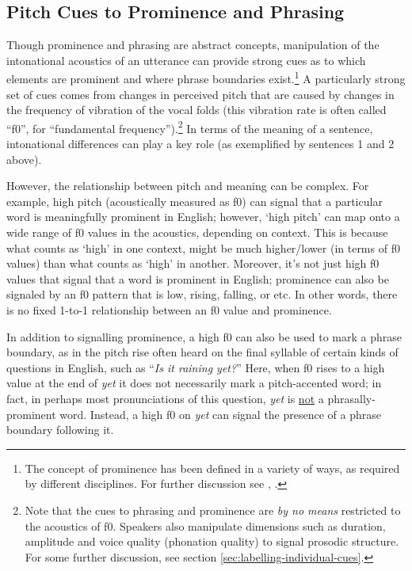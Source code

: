 \documentclass[11pt, twoside]{memoir}
\def\langtext#1{\textit{#1}}
\begin{document}
\subsection{Pitch Cues to Prominence and Phrasing}\label{sec:pitch-cues-to-prominence-and-phrasing}

Though prominence and phrasing are abstract concepts, manipulation of the intonational acoustics of an utterance can provide strong cues as to which elements are prominent and where phrase boundaries exist.\footnote{The concept of prominence has been defined in a variety of ways, as required by different disciplines. For further discussion see \citealt{gussenhoven15}, \citealt{wagner-15}.} A particularly strong set of cues comes from changes in perceived pitch that are caused by changes in the frequency of vibration of the vocal folds (this vibration rate is often called “f0”, for “fundamental frequency”).\footnote{Note that the cues to phrasing and prominence are \textit{by no means} restricted to the acoustics of f0.  Speakers also manipulate dimensions such as duration, amplitude and voice quality (phonation quality) to signal prosodic structure. For some further discussion, see section \ref{sec:labelling-individual-cues}.} In terms of the meaning of a sentence, intonational differences can play a key role (as exemplified by sentences 1 and 2 above).

However, the relationship between pitch and meaning can be complex. For example, high pitch (acoustically measured as f0) can signal that a particular word is meaningfully prominent in English; however, ‘high pitch’ can map onto a wide range of f0 values in the acoustics, depending on context. This is because what counts as ‘high’ in one context, might be much higher\slash lower (in terms of f0 values) than what counts as ‘high’ in another. Moreover, it’s not just high f0 values that signal that a word is prominent in English; prominence can also be signaled by an f0 pattern that is low, rising, falling, or etc. In other words, there is no fixed 1-to-1 relationship between an f0 value and prominence.

In addition to signalling prominence, a high f0 can also be used to mark a phrase boundary, as in the pitch rise often heard on the final syllable of certain kinds of questions in English, such as “\langtext{Is it raining yet?}” Here, when f0 rises to a high value at the end of \langtext{yet} it does not necessarily mark a pitch-accented word; in fact, in perhaps most pronunciations of this question, \langtext{yet} is \uline{not} a phrasally-prominent word. Instead, a high f0 on \langtext{yet} can signal the presence of a phrase boundary following it.
\end{document}
